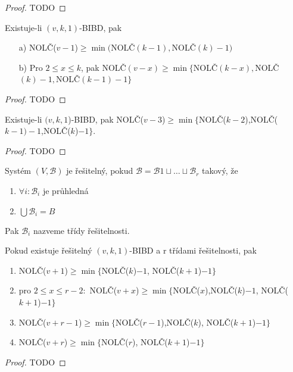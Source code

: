 \begin{proof}
    TODO
\end{proof}
\begin{theorem}
    Existuje-li $(v,k,1)$-BIBD, pak
    \begin{itemize}
        \item[a)] NOLČ($v-1$)$\geq\min($NOLČ$(k-1),$NOLČ$(k)-1)$
        \item[b)] Pro $2\leq x\leq k$, pak NOLČ$(v-x)\geq\min\{$NOLČ$(k-x),$NOLČ$(k)-1,$NOLČ$(k-1)-1\}$
    \end{itemize}
\end{theorem}
\begin{proof}
    TODO
\end{proof}
\begin{theorem}
    Existuje-li $(v,k,1$)-BIBD, pak NOLČ($v-3$)$\geq\min\{$NOLČ($k-2$),NOLČ($k-1)-1$,NOLČ($k$)$-1\}$.
\end{theorem}
\begin{proof}
    TODO
\end{proof}
\begin{definition}
    Systém $(V,\mathcal{B})$ je řešitelný, pokud $\mathcal{B}=\mathcal{B}1\sqcup\ldots\sqcup\mathcal{B}_r$ takový, že
    \begin{enumerate}
        \item $\forall i: \mathcal{B}_i$ je průhledná
        \item $\bigcup\mathcal{B}_i=B$
    \end{enumerate}

    Pak $\mathcal{B}_i$ nazveme třídy řešitelnosti.
\end{definition}
\begin{theorem}
    Pokud existuje řešitelný $(v,k,1)$-BIBD a r třídami řešitelnosti, pak
    \begin{enumerate}
        \item NOLČ($v+1$)$\geq\min\{$NOLČ($k$)$-1$, NOLČ($k+1$)$-1\}$
        \item pro $2\leq x\leq r-2:$ NOLČ($v+x$)$\geq\min\{$NOLČ($x$),NOLČ($k$)$-1$, NOLČ($k+1$)$-1\}$
        \item NOLČ($v+r-1$)$\geq\min\{$NOLČ($r-1$),NOLČ($k$), NOLČ($k+1$)$-1\}$
        \item NOLČ($v+r$)$\geq\min\{$NOLČ($r$), NOLČ($k+1$)$-1\}$
    \end{enumerate}
\end{theorem}
\begin{proof}
    TODO
\end{proof}

